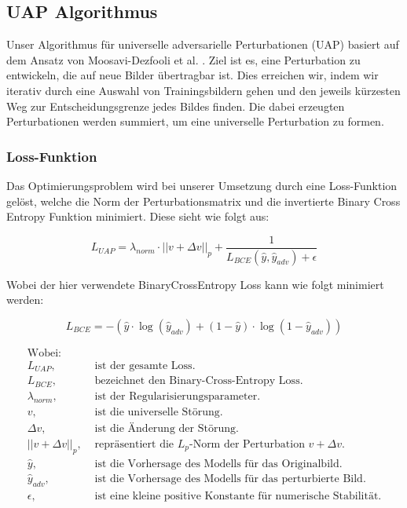 \subsection{UAP Algorithmus}

Unser Algorithmus für universelle adversarielle Perturbationen (UAP) basiert auf dem Ansatz von Moosavi-Dezfooli et al. \cite{moosavi-dezfooli_universal_2017}. Ziel ist es, eine Perturbation zu entwickeln, die auf neue Bilder übertragbar ist. Dies erreichen wir, indem wir iterativ durch eine Auswahl von Trainingsbildern gehen und den jeweils kürzesten Weg zur Entscheidungsgrenze jedes Bildes finden. Die dabei erzeugten Perturbationen werden summiert, um eine universelle Perturbation zu formen. 

\subsubsection{Loss-Funktion}
Das Optimierungsproblem wird bei unserer Umsetzung durch eine Loss-Funktion gelöst, welche die Norm der Perturbationsmatrix und die invertierte Binary Cross Entropy Funktion minimiert. Diese sieht wie folgt aus:

\begin{equation}
    L_{UAP} = \lambda_{norm} \cdot ||v + \Delta v||_p + \frac{1}{L_{BCE}(\hat{y}, \hat{y}_{adv}) + \epsilon}
\label{Loss}
\end{equation}

Wobei der hier verwendete BinaryCrossEntropy Loss kann wie folgt minimiert werden:

\begin{equation}
L_{BCE} = - (\hat{y} \cdot \log(\hat{y}_{adv}) + (1-\hat{y}) \cdot \log(1-\hat{y}_{adv}))
\label{eq:BCE}
\end{equation}

\begin{align*}
\text{Wobei:}&\\
L_{UAP}, &\text{ ist der gesamte Loss.} \\
L_{BCE}, &\text{ bezeichnet den Binary-Cross-Entropy Loss.} \\
\lambda_{norm}, &\text{ ist der Regularisierungsparameter.} \\
v, &\text{ ist die universelle Störung.} \\
\Delta v, &\text{ ist die Änderung der Störung.} \\
||v + \Delta v||_p, &\text{ repräsentiert die } L_p \text{-Norm der Perturbation } v + \Delta v. \\
\hat{y}, &\text{ ist die Vorhersage des Modells für das Originalbild.} \\
\hat{y}_{adv}, &\text{ ist die Vorhersage des Modells für das perturbierte Bild.} \\
\epsilon, &\text{ ist eine kleine positive Konstante für numerische Stabilität.}
\end{align*}

